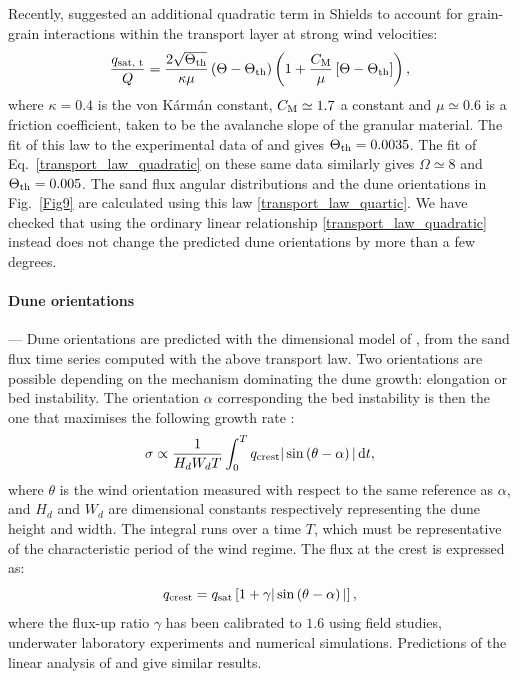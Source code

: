 Recently, \citet{Pahtz2020} suggested an additional quadratic term in Shields to account for grain-grain interactions within the transport layer at strong wind velocities:
%
\begin{equation}
\label{transport_law_quartic}
\frac{q_{\textup{sat, t}}}{Q} = \frac{2\sqrt{\Theta_{\textup{th}}}}{\kappa\mu}\left(\Theta - \Theta_{\textup{th}}\right)\left(1 +\frac{C_{\textup{M}}}{\mu}\left[\Theta - \Theta_{\textup{th}}\right]\right),
\end{equation}
%
where $\kappa = 0.4$ is the von K\'arm\'an constant, $C_{\rm M} \simeq 1.7$ a constant and $\mu \simeq 0.6$ is a friction coefficient, taken to be the avalanche slope of the granular material. The fit of this law to the experimental data of \citet{Creyssels2009} and \citet{Ho2011} gives $\Theta_{\textup{th}} = 0.0035$. The fit of Eq.~\ref{transport_law_quadratic} on these same data similarly gives $\Omega \simeq 8$ and $\Theta_{\textup{th}} = 0.005$. The sand flux angular distributions and the dune orientations in Fig.~\ref{Fig9} are calculated using this law \eqref{transport_law_quartic}. We have checked that using the ordinary linear relationship \eqref{transport_law_quadratic} instead does not change the predicted dune orientations by more than a few degrees.

\paragraph{Dune orientations} ---
Dune orientations are predicted with the dimensional model of \citet{Courrech2014}, from the sand flux time series computed with the above transport law. Two orientations are possible depending on the mechanism dominating the dune growth: elongation or bed instability. The orientation $\alpha$ corresponding the bed instability is then the one that maximises the following growth rate \citep{Rubin1987}:
%
\begin{equation}
\sigma \propto \frac{1}{H_{d} W_{d} T}\int_0^T  q_{\textup{crest}}\vert \sin\left(\theta - \alpha\right) \vert \, \textup{d}t,
\end{equation}
%
where $\theta$ is the wind orientation measured with respect to the same reference as $\alpha$, and $H_{d}$ and $W_{d}$ are dimensional constants respectively representing the dune height and width. The integral runs over a time $T$, which must be representative of the characteristic period of the wind regime. The flux at the crest is expressed as:
%
\begin{equation}
q_{\textup{crest}} = q_{\textup{sat}}\left[1 + \gamma\vert\sin\left(\theta - \alpha\right)\vert\right],
\end{equation}
%
where the flux-up ratio $\gamma$ has been calibrated to $1.6$ using field studies, underwater laboratory experiments and numerical simulations. Predictions of the linear analysis of \citet{Gadal2019} and \citet{Delorme2020} give similar results.

